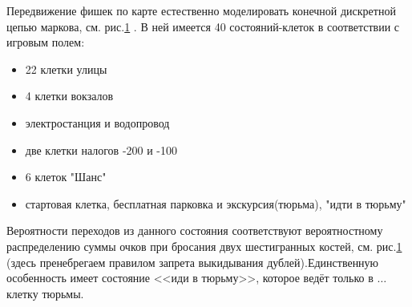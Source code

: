 	Передвижение фишек по карте естественно моделировать конечной дискретной цепью маркова, см. рис.\ref{pic:prob_distr_stoch} . В ней имеется 40 состояний-клеток в соответствии с игровым полем:
	
	\begin{itemize}
		\item 22 клетки улицы
		\item 4 клетки вокзалов
		\item электростанция и водопровод
		\item две клетки налогов -200 и -100
		\item 6 клеток "Шанс"
		\item стартовая клетка, бесплатная парковка и экскурсия(тюрьма), "идти в тюрьму" 
	\end{itemize}
	
	Вероятности переходов из данного состояния соответствуют вероятностному распределению суммы очков при бросания двух шестигранных костей, см. рис.\ref{pic:prob_distr_stoch}  (здесь пренебрегаем правилом запрета выкидывания дублей).Единственную особенность имеет состояние <<иди в тюрьму>>, которое ведёт только в $\ldots$ клетку тюрьмы.
	
	\begin{figure}[h]
		\caption{}\label{pic:prob_distr_stoch}
	\end{figure}

